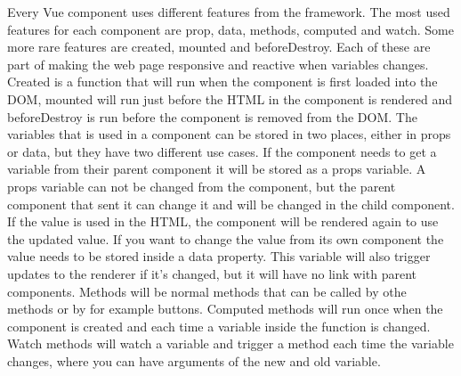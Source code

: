 Every Vue component uses different features from the framework. The most used features for each component are prop, data, methods, computed and watch. Some more rare features are created, mounted and beforeDestroy. Each of these are part of making the web page responsive and reactive when variables changes. Created is a function that will run when the component is first loaded into the DOM, mounted will run just before the HTML in the component is rendered and beforeDestroy is run before the component is removed from the DOM. The variables that is used in a component can be stored in two places, either in props or data, but they have two different use cases. If the component needs to get a variable from their parent component it will be stored as a props variable. A props variable can not be changed from the component, but the parent component that sent it can change it and will be changed in the child component. If the value is used in the HTML, the component will be rendered again to use the updated value. If you want to change the value from its own component the value needs to be stored inside a data property. This variable will also trigger updates to the renderer if it's changed, but it will have no link with parent components. Methods will be normal methods that can be called by othe methods or by for example buttons. Computed methods will run once when the component is created and each time a variable inside the function is changed. Watch methods will watch a variable and trigger a method each time the variable changes, where you can have arguments of the new and old variable.
